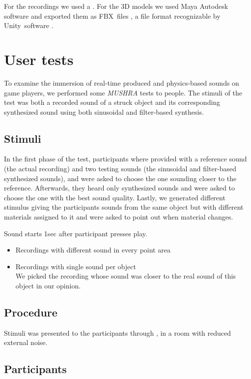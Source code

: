 For the recordings we used a . For the 3D models we used Maya Autodesk software \cite{bib:maya} and exported them as FBX\textregistered\ files \cite{bib:fbx}, a file format recognizable by Unity\textregistered\ software \cite{bib:unity}.

\section{User tests}

To examine the immersion of real-time produced and physics-based sounds on game players, we performed some \textit{MUSHRA} tests to people. The stimuli of the test was both a recorded sound of a struck object and its corresponding synthesized sound using both sinusoidal and filter-based synthesis.

\subsection{Stimuli}
In the first phase of the test, participants where provided with a reference sound (the actual recording) and two testing sounds (the sinusoidal and filter-based synthesized sounds), and were asked to choose the one sounding closer to the reference. Afterwards, they heard only synthesized sounds and were asked to choose the one with the best sound quality. Lastly, we generated different stimulus giving the participants sounds from the same object but with different materials assigned to it and were asked to point out when material changes. 


Sound starts 1sec after participant presses play.
\begin{itemize}
\item Recordings with different sound in every point area
\item Recordings with single sound per object\\
We picked the recording whose sound was closer to the real sound of this object in our opinion.\\

\end{itemize}

\subsection{Procedure}
Stimuli was presented to the participants through , in a room with reduced external noise.

\subsection{Participants}
